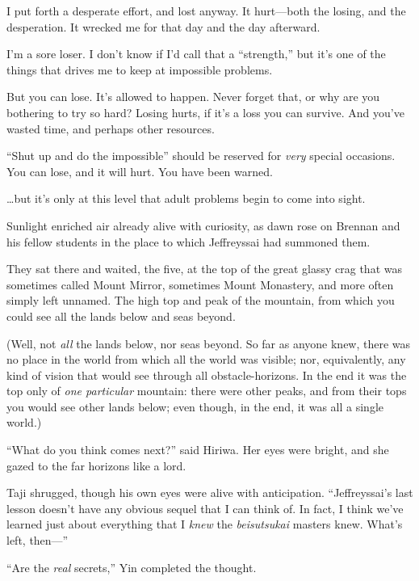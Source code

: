 {
 I put forth a desperate effort, and lost anyway. It hurt---both
the losing, and the desperation. It wrecked me for that day and the day
afterward.}

{
 I'm a sore loser. I don't know if
I'd call that a
``strength,'' but
it's one of the things that drives me to keep at
impossible problems.}

{
 But you can lose. It's allowed to happen. Never
forget that, or why are you bothering to try so hard? Losing hurts, if
it's a loss you can survive. And you've
wasted time, and perhaps other resources.}

{
 ``Shut up and do the
impossible'' should be reserved for \textit{very}
special occasions. You can lose, and it will hurt. You have been
warned.}

{
 \ldots but it's only at this level that adult
problems begin to come into sight.}

\myendsectiontext


{
 Sunlight enriched air already alive with curiosity, as dawn rose
on Brennan and his fellow students in the place to which Jeffreyssai
had summoned them. }

{
 They sat there and waited, the five, at the top of the great
glassy crag that was sometimes called Mount Mirror, sometimes Mount
Monastery, and more often simply left unnamed. The high top and peak of
the mountain, from which you could see all the lands below and seas
beyond.}

{
 (Well, not \textit{all} the lands below, nor seas beyond. So far
as anyone knew, there was no place in the world from which all the
world was visible; nor, equivalently, any kind of vision that would see
through all obstacle-horizons. In the end it was the top only of
\textit{one particular} mountain: there were other peaks, and from
their tops you would see other lands below; even though, in the end, it
was all a single world.)}

{
 ``What do you think comes
next?'' said Hiriwa. Her eyes were bright, and she
gazed to the far horizons like a lord.}

{
 Taji shrugged, though his own eyes were alive with anticipation.
``Jeffreyssai's last lesson
doesn't have any obvious sequel that I can think of. In
fact, I think we've learned just about everything that
I \textit{knew} the \textit{beisutsukai} masters knew.
What's left, then---''}

{
 ``Are the \textit{real}
secrets,'' Yin completed the thought.}

